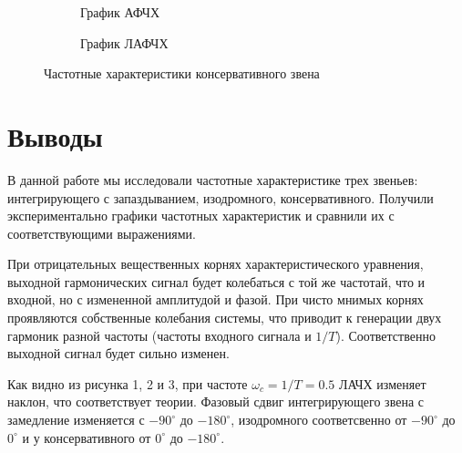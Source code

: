 \documentclass[a4paper, 11pt]{article}
\begin{document}
\begin{figure}[h!]
    \begin{subfigure}{0.5\textwidth}
        \centering
        \caption{График АФЧХ}
    \end{subfigure}
    \begin{subfigure}{0.5\textwidth}
        \centering
        \caption{График ЛАФЧХ}
    \end{subfigure}
    \caption{Частотные характеристики консервативного звена}
\end{figure}

\newpage
\section*{Выводы}
В данной работе мы исследовали частотные характеристике трех звеньев: интегрирующего с запаздыванием, изодромного, консервативного. Получили экспериментально графики частотных характеристик и сравнили их с соответствующими выражениями. \par
При отрицательных вещественных корнях характеристического уравнения, выходной гармонических сигнал будет колебаться с той же частотай, что и входной, но с измененной амплитудой и фазой. При чисто мнимых корнях проявляются собственные колебания системы, что приводит к генерации двух гармоник разной частоты (частоты входного сигнала и $1/T$). Соответственно выходной сигнал будет сильно изменен. \par
Как видно из рисунка 1, 2 и 3, при частоте $\omega_c = 1/T = 0.5$ ЛАЧХ изменяет наклон, что соответствует теории. Фазовый сдвиг интегрирующего звена с замедление изменяется с $-90^{\circ}$ до $-180^{\circ}$, изодромного соответсвенно от $-90^\circ$ до $0^\circ$ и у консервативного от $0^\circ$ до $-180^\circ$.
\end{document}
